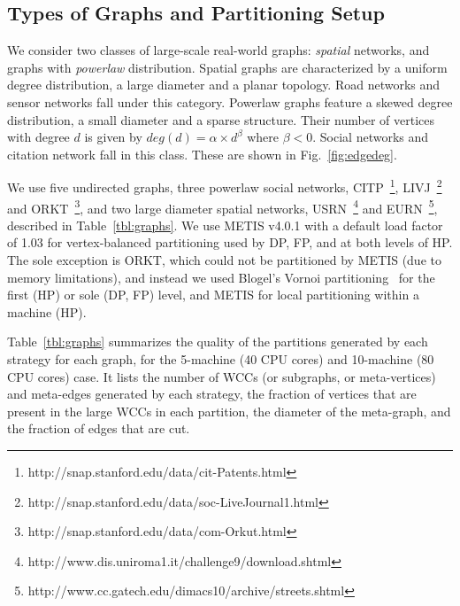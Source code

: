 \documentclass[10pt,conference, compsocconf]{IEEEtran}
\begin{document}
\subsection{Types of Graphs and Partitioning Setup}
\label{sec:graphs}
We consider two classes of large-scale real-world graphs: \emph{spatial} networks, and graphs with \emph{powerlaw} distribution. Spatial graphs are characterized by a uniform degree distribution, a large diameter and a planar topology. Road networks and sensor networks fall under this category.
Powerlaw graphs feature a skewed degree distribution, a small diameter and a sparse structure. Their number of vertices with degree $d$ is given by $deg(d) = \alpha \times d^\beta$ where $\beta < 0$. Social networks and citation network fall in this class. These are shown in Fig.~\ref{fig:edgedeg}.


We use five undirected graphs, three powerlaw social networks, CITP~\footnote{http://snap.stanford.edu/data/cit-Patents.html}, LIVJ~\footnote{http://snap.stanford.edu/data/soc-LiveJournal1.html} and ORKT~\footnote{http://snap.stanford.edu/data/com-Orkut.html}, and two large diameter spatial networks, USRN~\footnote{http://www.dis.uniroma1.it/challenge9/download.shtml} and EURN~\footnote{http://www.cc.gatech.edu/dimacs10/archive/streets.shtml}, described in Table~\ref{tbl:graphs}. We use METIS v4.0.1 with a default load factor of 1.03 for vertex-balanced partitioning used by DP, FP, and at both levels of HP. The sole exception is ORKT, which could not be partitioned by METIS (due to memory limitations), and instead we used Blogel's Vornoi partitioning~\cite{blogel} for the first (HP) or sole (DP, FP) level, and METIS for local partitioning within a machine (HP).

Table~\ref{tbl:graphs} summarizes the quality of the partitions generated by each strategy for each graph, for the 5-machine (40 CPU cores) and 10-machine (80 CPU cores) case. It lists the number of WCCs (or subgraphs, or meta-vertices) and meta-edges generated by each strategy, the fraction of vertices that are present in the large WCCs in each partition, the diameter of the meta-graph, and the fraction of edges that are cut.
\end{document}
